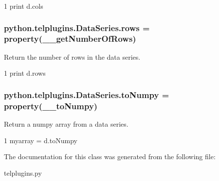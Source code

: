 \begin{DoxyCode}
1 \textcolor{keywordflow}{print} d.cols
\end{DoxyCode}
 \hypertarget{classpython_1_1telplugins_1_1_data_series_a79a79ef89d47682c0fcc0620d1bf21b5}{
\subsubsection[{rows}]{\setlength{\rightskip}{0pt plus 5cm}python.\-telplugins.\-Data\-Series.\-rows = property(\-\_\-\-\_\-get\-Number\-Of\-Rows)\hspace{0.3cm}{\ttfamily [static]}}}\label{classpython_1_1telplugins_1_1_data_series_a79a79ef89d47682c0fcc0620d1bf21b5}


Return the number of rows in the data series. 


\begin{DoxyCode}
1 \textcolor{keywordflow}{print} d.rows
\end{DoxyCode}
 \hypertarget{classpython_1_1telplugins_1_1_data_series_a82084dee126303cc0322e31e48239e76}{
\subsubsection[{to\-Numpy}]{\setlength{\rightskip}{0pt plus 5cm}python.\-telplugins.\-Data\-Series.\-to\-Numpy = property(\-\_\-\-\_\-to\-Numpy)\hspace{0.3cm}{\ttfamily [static]}}}\label{classpython_1_1telplugins_1_1_data_series_a82084dee126303cc0322e31e48239e76}


Return a numpy array from a data series. 


\begin{DoxyCode}
1 myarray = d.toNumpy
\end{DoxyCode}
 

The documentation for this class was generated from the following file\-:\begin{DoxyCompactItemize}
\item 
telplugins.\-py\end{DoxyCompactItemize}
